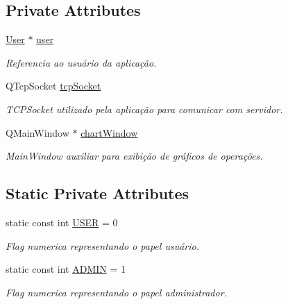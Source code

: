 \subsection*{Private Attributes}
\begin{DoxyCompactItemize}
\item 
\hyperlink{classUser}{User} $\ast$ \hyperlink{classMyCalcWindow_a730189195d0831ae9fee62f7c519e439}{user}\hypertarget{classMyCalcWindow_a730189195d0831ae9fee62f7c519e439}{}\label{classMyCalcWindow_a730189195d0831ae9fee62f7c519e439}

\begin{DoxyCompactList}\small\item\em Referencia ao usuário da aplicação. \end{DoxyCompactList}\item 
Q\+Tcp\+Socket \hyperlink{classMyCalcWindow_aa07c81871dc4b11ab83324b544d66733}{tcp\+Socket}\hypertarget{classMyCalcWindow_aa07c81871dc4b11ab83324b544d66733}{}\label{classMyCalcWindow_aa07c81871dc4b11ab83324b544d66733}

\begin{DoxyCompactList}\small\item\em T\+C\+P\+Socket utilizado pela aplicação para comunicar com servidor. \end{DoxyCompactList}\item 
Q\+Main\+Window $\ast$ \hyperlink{classMyCalcWindow_a98ecf548e0cb3586ff4afc33bdfacb7a}{chart\+Window}\hypertarget{classMyCalcWindow_a98ecf548e0cb3586ff4afc33bdfacb7a}{}\label{classMyCalcWindow_a98ecf548e0cb3586ff4afc33bdfacb7a}

\begin{DoxyCompactList}\small\item\em Main\+Window auxiliar para exibição de gráficos de operações. \end{DoxyCompactList}\end{DoxyCompactItemize}
\subsection*{Static Private Attributes}
\begin{DoxyCompactItemize}
\item 
static const int \hyperlink{classMyCalcWindow_a5aad7da85f794398e01c5b553eff0fae}{U\+S\+ER} = 0\hypertarget{classMyCalcWindow_a5aad7da85f794398e01c5b553eff0fae}{}\label{classMyCalcWindow_a5aad7da85f794398e01c5b553eff0fae}

\begin{DoxyCompactList}\small\item\em Flag numerica representando o papel usuário. \end{DoxyCompactList}\item 
static const int \hyperlink{classMyCalcWindow_ac29d883c4ff53cc9d01c3e2add2fec52}{A\+D\+M\+IN} = 1\hypertarget{classMyCalcWindow_ac29d883c4ff53cc9d01c3e2add2fec52}{}\label{classMyCalcWindow_ac29d883c4ff53cc9d01c3e2add2fec52}

\begin{DoxyCompactList}\small\item\em Flag numerica representando o papel administrador. \end{DoxyCompactList}\end{DoxyCompactItemize}
